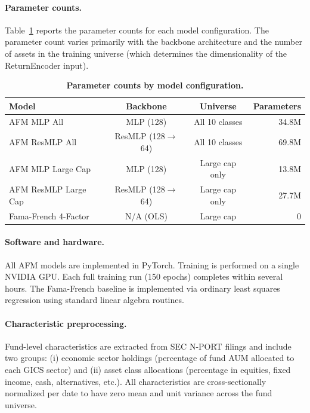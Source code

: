 \paragraph{Parameter counts.}
Table~\ref{tab:param_counts} reports the parameter counts for each model configuration. The parameter count varies primarily with the backbone architecture and the number of assets in the training universe (which determines the dimensionality of the ReturnEncoder input).

\begin{table}[h]
\centering
\caption{\textbf{Parameter counts by model configuration.}}
\label{tab:param_counts}
\begin{tabular}{lccr}
\toprule
\textbf{Model} & \textbf{Backbone} & \textbf{Universe} & \textbf{Parameters} \\
\midrule
AFM MLP All & MLP (128) & All 10 classes & 34.8M \\
AFM ResMLP All & ResMLP (128$\to$64) & All 10 classes & 69.8M \\
AFM MLP Large Cap & MLP (128) & Large cap only & 13.8M \\
AFM ResMLP Large Cap & ResMLP (128$\to$64) & Large cap only & 27.7M \\
Fama-French 4-Factor & N/A (OLS) & Large cap & 0 \\
\bottomrule
\end{tabular}
\end{table}

\paragraph{Software and hardware.}
All AFM models are implemented in PyTorch. Training is performed on a single NVIDIA GPU. Each full training run (150 epochs) completes within several hours. The Fama-French baseline is implemented via ordinary least squares regression using standard linear algebra routines.

\paragraph{Characteristic preprocessing.}
Fund-level characteristics are extracted from SEC N-PORT filings and include two groups: (i) economic sector holdings (percentage of fund AUM allocated to each GICS sector) and (ii) asset class allocations (percentage in equities, fixed income, cash, alternatives, etc.). All characteristics are cross-sectionally normalized per date to have zero mean and unit variance across the fund universe.

